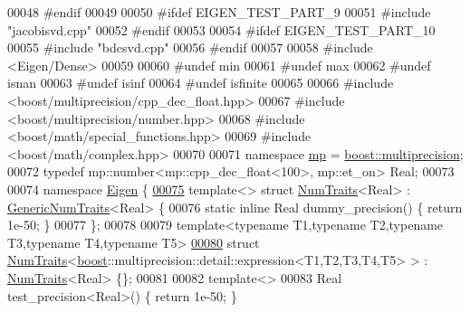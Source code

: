 \begin{DoxyCode}
00048 \textcolor{preprocessor}{#endif}
00049 
00050 \textcolor{preprocessor}{#ifdef EIGEN\_TEST\_PART\_9}
00051 \textcolor{preprocessor}{#include "jacobisvd.cpp"}
00052 \textcolor{preprocessor}{#endif}
00053 
00054 \textcolor{preprocessor}{#ifdef EIGEN\_TEST\_PART\_10}
00055 \textcolor{preprocessor}{#include "bdcsvd.cpp"}
00056 \textcolor{preprocessor}{#endif}
00057 
00058 \textcolor{preprocessor}{#include <Eigen/Dense>}
00059 
00060 \textcolor{preprocessor}{#undef min}
00061 \textcolor{preprocessor}{#undef max}
00062 \textcolor{preprocessor}{#undef isnan}
00063 \textcolor{preprocessor}{#undef isinf}
00064 \textcolor{preprocessor}{#undef isfinite}
00065 
00066 \textcolor{preprocessor}{#include <boost/multiprecision/cpp\_dec\_float.hpp>}
00067 \textcolor{preprocessor}{#include <boost/multiprecision/number.hpp>}
00068 \textcolor{preprocessor}{#include <boost/math/special\_functions.hpp>}
00069 \textcolor{preprocessor}{#include <boost/math/complex.hpp>}
00070 
00071 \textcolor{keyword}{namespace }\hyperlink{namespaceboost_1_1multiprecision}{mp} = \hyperlink{namespaceboost_1_1multiprecision}{boost::multiprecision};
00072 \textcolor{keyword}{typedef} mp::number<mp::cpp\_dec\_float<100>, mp::et\_on> Real;
00073 
00074 \textcolor{keyword}{namespace }\hyperlink{namespace_eigen}{Eigen} \{
\hyperlink{struct_eigen_1_1_num_traits_3_01_real_01_4}{00075}   \textcolor{keyword}{template}<> \textcolor{keyword}{struct }\hyperlink{group___core___module_struct_eigen_1_1_num_traits}{NumTraits}<Real> : \hyperlink{struct_eigen_1_1_generic_num_traits}{GenericNumTraits}<Real> \{
00076     \textcolor{keyword}{static} \textcolor{keyword}{inline} Real dummy\_precision() \{ \textcolor{keywordflow}{return} 1e-50; \}
00077   \};
00078 
00079   \textcolor{keyword}{template}<\textcolor{keyword}{typename} T1,\textcolor{keyword}{typename} T2,\textcolor{keyword}{typename} T3,\textcolor{keyword}{typename} T4,\textcolor{keyword}{typename} T5>
\hyperlink{struct_eigen_1_1_num_traits_3_01boost_1_1multiprecision_1_1detail_1_1expression_3_01_t1_00_01_t2de536fef90a65f9e6892d34a2e1ed34d}{00080}   \textcolor{keyword}{struct }\hyperlink{group___core___module_struct_eigen_1_1_num_traits}{NumTraits}<\hyperlink{namespaceboost}{boost}::multiprecision::detail::expression<T1,T2,T3,T4,T5> > : 
      \hyperlink{group___core___module_struct_eigen_1_1_num_traits}{NumTraits}<Real> \{\};
00081 
00082   \textcolor{keyword}{template}<>
00083   Real test\_precision<Real>() \{ \textcolor{keywordflow}{return} 1e-50; \}

\end{DoxyCode}
